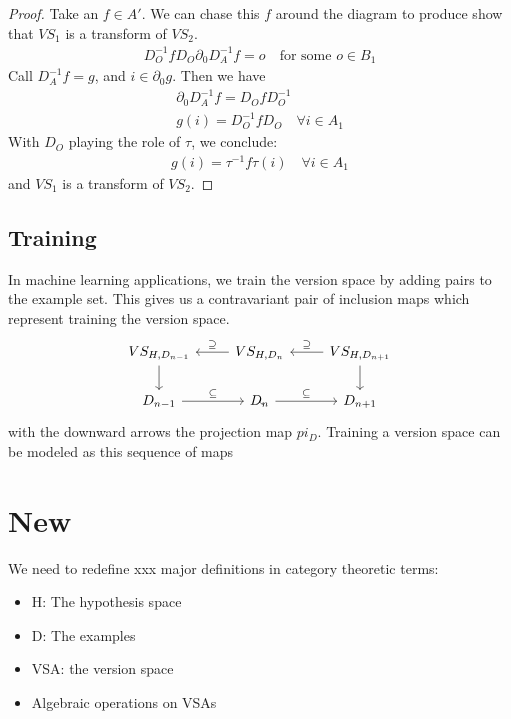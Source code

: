 \documentclass{article}
\theoremstyle{definition}
\begin{document}
\begin{proof}
Take an $f\in A'$. We can chase this $f$ around the diagram to produce show that $VS_1$ is a transform of $VS_2$. 
\begin{gather*}
    D_O^{-1} f D_O \partial_0 D_{A}^{-1} f = o \quad \text{for some $o \in B_1$}
\end{gather*}
Call $D^{-1}_A f = g$, and $i \in \partial_0 g$. Then we have 
\begin{gather*}
    \partial_0 D_A^{-1} f = D_O f D_O^{-1} \\
    g(i) = D_O^{-1} f D_O \quad \forall i \in A_1 
\end{gather*}
With $D_O$ playing the role of $\tau$, we conclude: 
\begin{gather*}
    g(i) = \tau^{-1} f \tau(i) \quad \forall i \in A_1
\end{gather*}
and $VS_1$ is a transform of $VS_2$. 
\end{proof}

\subsection{Training}
In machine learning applications, we train the version space by adding pairs to the example set. This gives us a contravariant pair of inclusion maps which represent training the version space. 
\[\begin{tikzcd}
	{VS_{H,D_{n-1}}} & {VS_{H,D_n}} & {VS_{H,D_{n+1}}} \\
	{D_{n-1}} & {D_n} & {D_{n+1}}
	\arrow["\supseteq"', from=1-3, to=1-2]
	\arrow["\subseteq", from=2-2, to=2-3]
	\arrow[from=2-2, to=2-2]
	\arrow[from=1-3, to=2-3]
	\arrow["\supseteq"', from=1-2, to=1-1]
	\arrow["\subseteq", from=2-1, to=2-2]
	\arrow[from=1-1, to=2-1]
\end{tikzcd}\]
with the downward arrows the projection map $pi_D$. Training a version space can be modeled as this sequence of maps

\section{New}
We need to redefine xxx major definitions in category theoretic terms: 
\begin{itemize}
    \item H: The hypothesis space
    \item D: The examples
    \item VSA: the version space
    \item Algebraic operations on VSAs
\end{itemize}
\end{document}
